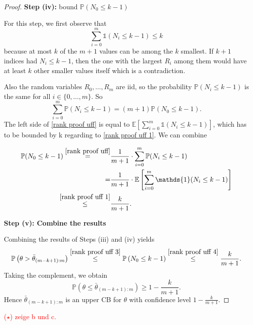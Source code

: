 \begin{proof}
	
	\textbf{Step (iv):} bound $\mathbb{P} (N_0 \leq k-1)$
	
	For this step, we first observe that 
	\begin{equation} \label{rank proof uff 1}
		\sum_{i = 0}^m \mathds{1} (N_i \leq k-1) \leq k 
	\end{equation}
	because at most $k$ of the $m+1$ values can be among the $k$ smallest. If $k+1$ indices had $N_i \leq k-1$, then the one with the largest $R_i$ among them would have at least $k$ other smaller values itself which is a contradiction.
	
	Also the random variables $R_0, \ldots , R_m$ are iid, so the probability $\mathbb{P} (N_i \leq k-1)$ is the same for all $i \in \{0, \ldots , m\}$. So 
	\begin{equation} \label{rank proof uff}
		\sum_{i = 0}^m \mathbb{P} (N_i \leq k-1) = (m+1) \mathbb{P} (N_0 \leq k-1).
	\end{equation} 
	The left side of \eqref{rank proof uff} is equal to $\mathbb E \left[ \sum_{i = 0}^m \mathds{1} (N_i \leq k-1) \right]$, which has to be bounded by k regarding to \eqref{rank proof uff 1}. We can combine 
	
	\begin{align}
		\mathbb{P} (N_0 \leq k-1) 
		\overset{\eqref{rank proof uff}}{=} &
		\frac{1}{m+1} \cdot \sum_{i = 0}^m \mathbb{P} (N_i \leq k-1)
		\notag
		\\
		=&
		\frac{1}{m+1} \cdot \mathbb E \left[ \sum_{i = 0}^m \mathds{1} (N_i \leq k-1) \right]
		\notag
		\\
		\overset{\eqref{rank proof uff 1}}{\leq}&
		\frac{k}{m+1}. \label{rank proof uff 4}
	\end{align}
	
	\textbf{Step (v): Combine the results}
	
	Combining the results of Steps (iii) and (iv) yields
	\begin{equation*}
		\mathbb{P} \left( \theta > \bar \theta_{(m-k+1):m} \right)
		\overset{\eqref{rank proof uff 3}}{\leq}
		\mathbb{P} \left( N_0 \leq k-1 \right)
		\overset{\eqref{rank proof uff 4}}{\leq}
		\frac{k}{m+1}.
	\end{equation*}
	Taking the complement, we obtain
	\[
	\mathbb{P} \left( \theta \leq \bar \theta_{(m-k+1):m} \right) \geq 1 - \frac{k}{m+1}.
	\]
	Hence $\bar \theta_{(m-k+1):m}$ is an upper CB for $\theta$ with confidence level $1 - \frac{k}{m+1}$.
\end{proof}

\textcolor{red}{($\star$) zeige b und c.}






